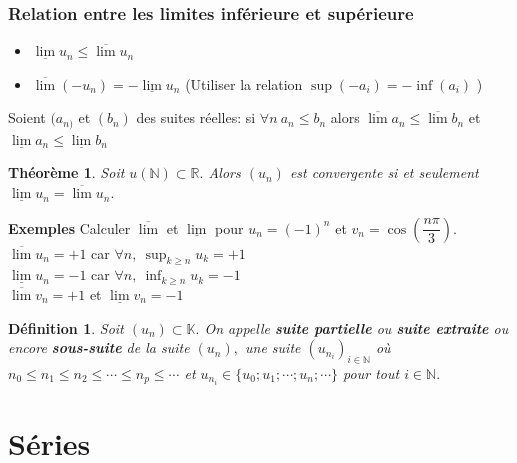 \documentclass[11pt, a4paper]{book}
\newtheorem{teo}{Th\'eor\`eme}[section]
\newtheorem{defi}{D\'efinition}[section]
\begin{document}
\subsubsection*{Relation entre les  limites  inf\'erieure et sup\'erieure }
\begin{itemize}
\item $ \underline{\lim}u_{n} \leq \overline{\lim}u_{n}$
\item $ \overline{\lim}(-u_{n})=-\underline{\lim}u_{n}$ (Utiliser la relation $ \sup(-a_{i})=-\inf (a_{i})$ )
\end{itemize}
     Soient $(a_{n)}$ et $(b_{n})$ des suites r\'eelles: si  $\forall	n ~a_{n} \leq b_{n}$ alors $ \overline{\lim}a_{n} \leq \overline{\lim}b_{n}$ et $ \underline{\lim}a_{n} \leq \underline{\lim}b_{n}$
\begin{teo} Soit $u(\mathbb{N}) \subset \mathbb{R}.$ Alors $(u_{n})$ est convergente si et seulement $ \underline{\lim}u_{n}=\overline{\lim}u_{n}.$ \end{teo}
\textbf{Exemples} Calculer $ \overline{\lim}$ et $\underline{\lim}$ pour $ u_{n}=(-1)^{n}$ et $v_{n}=\cos\left(\dfrac{n\pi}{3}\right).$\\ 
$\overline{\lim}u_{n}=+1$ car  ${\displaystyle\forall n,~ \sup_{k \geq n}u_{k}=+1}$\\
$\underline{\lim}u_{n}=-1$ car  ${\displaystyle\forall n,~ \inf_{k \geq n}u_{k}=-1}$\\
$\overline{\lim}v_{n}=+1$ et $ \underline{\lim}v_{n}=-1$\\
\begin{defi} Soit $(u_{n}) \subset \mathbb{K}.$ On appelle \textbf{ suite partielle} ou \textbf{ suite extraite} ou encore \textbf{  sous-suite} de la suite $(u_{n}),$ une suite $(u_{n_{i}})_{i \in \mathbb{N}}$ o\`u $n_{0}\leq n_{1}\leq n_{2}\leq \cdots \leq n_{p}\leq \cdots$ et $u_{n_{i}}\in \{u_{0};u_{1};\cdots ;u_{n};\cdots\}$ pour tout $i\in \mathbb{N}.$ \end{defi}

\section{S\'eries}
\end{document}
